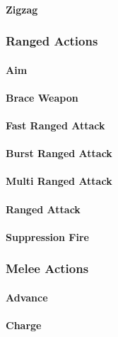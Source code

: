 \paragraph{Zigzag}

\subsubsection{Ranged Actions}

\paragraph{Aim}

\paragraph{Brace Weapon}

\paragraph{Fast Ranged Attack}

\paragraph{Burst Ranged Attack}

\paragraph{Multi Ranged Attack}

\paragraph{Ranged Attack}

\paragraph{Suppression Fire}

\subsubsection{Melee Actions}

\paragraph{Advance}

\paragraph{Charge}

